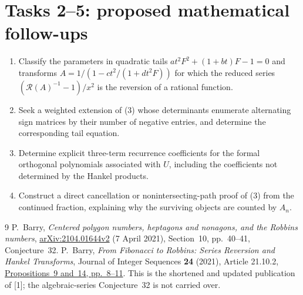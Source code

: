 \documentclass[11pt]{article}
\newcommand{\rev}{\mathcal R}
\begin{document}
\section*{Tasks 2--5: proposed mathematical follow-ups}
\begin{enumerate}[label=\textbf{Task \arabic*:},start=2,leftmargin=*]
\item Classify the parameters in quadratic tails
\(at^2F^2+(1+bt)F-1=0\) and transforms
\(A=1/(1-ct^2/(1+dt^2F))\) for which the reduced series
\((\rev(A)^{-1}-1)/x^2\) is the reversion of a rational function.
\item Seek a weighted extension of (3) whose determinants
enumerate alternating sign matrices by their number of
negative entries, and determine the corresponding tail equation.
\item Determine explicit three-term recurrence coefficients
for the formal orthogonal polynomials associated with \(U\),
including the coefficients not determined by the Hankel products.
\item Construct a direct cancellation or nonintersecting-path
proof of (3) from the continued fraction, explaining why the
surviving objects are counted by \(A_n\).
\end{enumerate}

\begin{thebibliography}{9}
P.~Barry, \emph{Centered polygon numbers, heptagons and nonagons,
and the Robbins numbers},
\href{https://arxiv.org/abs/2104.01644}{arXiv:2104.01644v2}
(7 April 2021), Section~10, pp.~40--41, Conjecture~32.
P.~Barry, \emph{From Fibonacci to Robbins: Series Reversion
and Hankel Transforms}, Journal of Integer Sequences
\textbf{24} (2021), Article 21.10.2,
\href{https://cs.uwaterloo.ca/journals/JIS/VOL24/Barry2/barry461.pdf}
{Propositions~9 and~14, pp.~8--11}.
This is the shortened and updated publication of [1];
the algebraic-series Conjecture~32 is not carried over.
\end{thebibliography}
\end{document}
